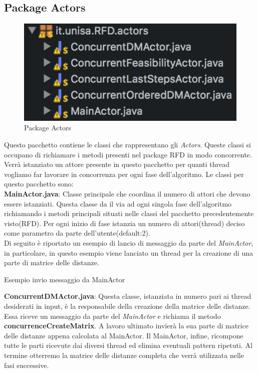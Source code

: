 \subsection{Package Actors}
\begin{figure}[H]
	\centering
	\includegraphics{Immagini/PackageActors.png}
	\caption{Package Actors}
	\label{fig:Package Actors}
\end{figure}
Questo pacchetto contiene le classi che rappresentano gli \emph{Actors}.
Queste classi si occupano di richiamare i metodi presenti nel package RFD in modo concorrente.
Verrà istanziato un attore presente in questo pacchetto per quanti thread vogliamo far lavorare in concorrenza per ogni fase dell'algoritmo.
Le classi per questo pacchetto sono:\\
\textbf{MainActor.java}:
Classe principale che coordina il numero di attori che devono essere istanziati.
Questa classe da il via ad ogni singola fase dell'algoritmo richiamando i metodi principali situati nelle classi del pacchetto precedentemente visto(RFD).
Per ogni inizio di fase istanzia un numero di attori(thread) deciso come parametro da parte dell'utente(default:2).\\
Di seguito è riportato un esempio di lancio di messaggio da parte del \emph{MainActor}, in particolare, in questo esempio viene lanciato un thread per la creazione di una parte di matrice delle distanze.\\
\begin{listing}[H]
	\caption{Esempio invio messaggio da MainActor}
	\label{Code:8}
\end{listing}
\textbf{ConcurrentDMActor.java}:
Questa classe, istanziata in numero pari ai thread desiderati in input, è la responsabile della creazione della matrice delle distanze. Essa riceve un messaggio da parte del \emph{MainActor} e richiama il metodo \textbf{concurrenceCreateMatrix}.
A lavoro ultimato invierà la sua parte di matrice delle distanze appena calcolata al MainActor. Il MainActor, infine, ricompone tutte le parti ricevute dai diversi thread ed elimina eventuali pattern ripetuti. Al termine otterremo la matrice delle distanze completa che verrà utilizzata nelle fasi successive.
